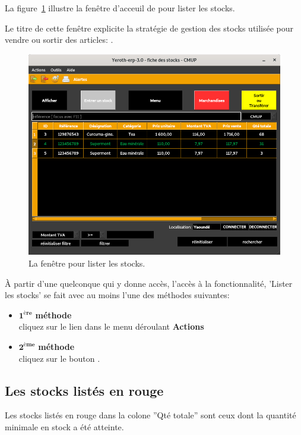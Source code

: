 La figure~\ref{fig:fenetre-lister} illustre la fen\^etre
d'acceuil de \yeren pour lister les stocks.

Le titre de cette fen\^etre explicite la strat\'egie
de gestion des stocks utilis\'ee pour vendre ou
sortir des articles: \cmup.\\

\begin{figure}[!htbp]
\centering
\includegraphics[scale=0.63]{images/yeren-fenetre-lister.png}
\caption{La fen\^etre pour lister les stocks.}
\label{fig:fenetre-lister}
\end{figure}

\`A partir d'une \fenetre quelconque qui y donne
acc\`es, l'acc\`es \`a la fonctionnalit\'e, 'Lister les stocks'
se fait avec au moins l'une des m\'ethodes suivantes: 

\begin{itemize}[]
	\item \textcolor{purplish}{$\mathbf{1^{\text{\`ere}}}$ \textbf{m\'ethode}}\\
		cliquez sur le lien 
		dans le menu d\'eroulant \textbf{Actions}\\

	\item \textcolor{purplish}{$\mathbf{2^{\text{\`eme}}}$ \textbf{m\'ethode}}\\
		cliquez sur le bouton .
\end{itemize}

\subsection{Les stocks list\'es en rouge}
Les stocks list\'es en \textcolor{firebrickred}{rouge} dans
la colone ''Qt\'e totale'' sont ceux dont la quantit\'e
minimale en stock a \'et\'e atteinte.

